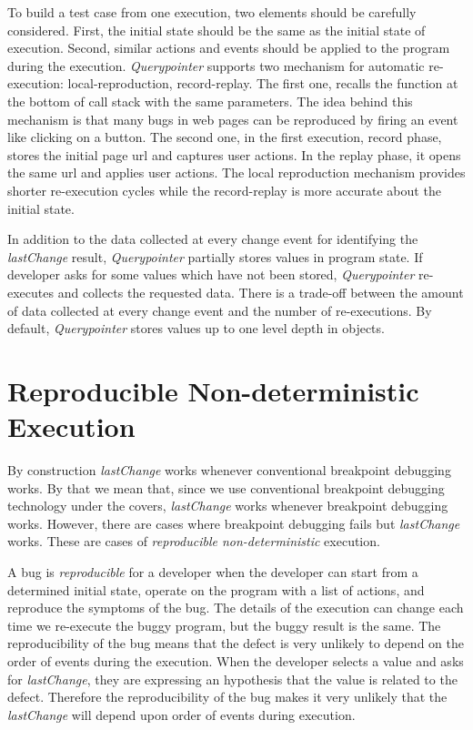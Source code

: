 \documentclass[preprint]{sigplanconf}
\begin{document}
To build a test case from one execution, two elements should be carefully 
considered. First, the initial state should be the same as the initial state
of execution. Second, similar actions and events should be applied to
the program during the execution. \textit{Querypointer} supports two mechanism
for automatic re-execution: local-reproduction, record-replay. The first one,
recalls the function at the bottom of call stack with the same parameters. The idea
behind this mechanism is that many bugs in web pages can be reproduced by firing
an event like clicking on a button. The second one, in the first execution, record phase, 
stores the initial page url and captures user actions. In the replay phase, it opens
the same url and applies user actions. The local reproduction mechanism provides
shorter re-execution cycles while the record-replay is more accurate about the
initial state.

In addition to the data collected at every change event for identifying the \textit{lastChange}
result, \textit{Querypointer} partially stores values in program state. If developer asks for 
some values which have not been stored, \textit{Querypointer} re-executes and collects the requested data.
There is a trade-off between the amount of data collected at every change event and the number of re-executions. 
By default, \textit{Querypointer} stores values up to one level depth in objects.




\section{Reproducible Non-deterministic Execution}

By construction \textit{lastChange} works whenever conventional
breakpoint debugging works. By that we mean that, since we use
conventional breakpoint debugging technology under the covers,
\textit{lastChange} works whenever breakpoint debugging
works. However, there are cases where breakpoint debugging fails but
\textit{lastChange} works.  These are cases of \textit{reproducible
  non-deterministic} execution.

A bug is \textit{reproducible} for a developer when the developer can
start from a determined initial state, operate on the program with a
list of actions, and reproduce the symptoms of the bug. The details of
the execution can change each time we re-execute the buggy program,
but the buggy result is the same.  The reproducibility of the bug
means that the defect is very unlikely to depend on the order of
events during the execution. When the developer selects a value and
asks for \textit{lastChange}, they are expressing an hypothesis that
the value is related to the defect. Therefore the reproducibility of
the bug makes it very unlikely that the \textit{lastChange} will
depend upon order of events during execution.
\end{document}
